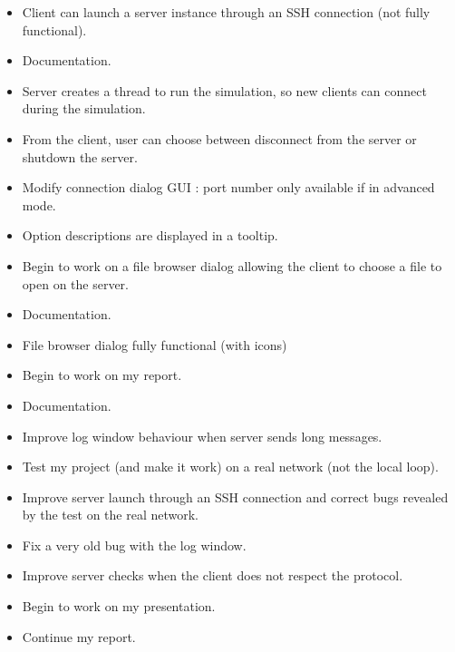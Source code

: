\begin{itemize}
 \item Client can launch a server instance through an SSH connection (not
fully functional).
 \item Documentation.
\end{itemize}

\begin{itemize}
 \item Server creates a thread to run the simulation, so new clients can connect
during the simulation.
 \item From the client, user can choose between disconnect from the server or
shutdown the server.
 \item Modify connection dialog GUI : port number only available if in advanced
mode.
 \item Option descriptions are displayed in a tooltip.
 \item Begin to work on a file browser dialog allowing the client to choose a
file to open on the server.
 \item Documentation.
\end{itemize}

\begin{itemize}
 \item File browser dialog fully functional (with icons) 
 \item Begin to work on my report.
 \item Documentation.
\end{itemize}

\begin{itemize}
 \item Improve log window behaviour when server sends long messages. 
 \item Test my project (and make it work) on a real network (not the local
loop).
 \item Improve server launch through an SSH connection and correct bugs
revealed by the test on the real network.
 \item Fix a very old bug with the log window.
 \item Improve server checks when the client does not respect the protocol.
 \item Begin to work on my presentation.
 \item Continue my report.
\end{itemize}

